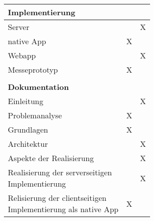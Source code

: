 \begin{table}[]
\begin{tabular}{|l|c|c|}
{\bf Implementierung}                                             &                                &                                     \\
\hline
Server                                                            &                                 & X                                   \\
\hline
native App                                                        & X                               &                                     \\
\hline
Webapp                                                            &                                 & X                                   \\
\hline
Messeprototyp                                                     & X                               &                                     \\
\hline
                                                                  &                                 &                                     \\
{\bf Dokumentation}                                               &                                 &                                     \\
\hline
Einleitung                                                        &                                 & X                                    \\
\hline
Problemanalyse                                                    & X                               &                                     \\
\hline
Grundlagen                                                        & X                               &                                     \\
\hline
Architektur                                                       &                                 & X                                   \\
\hline
Aspekte der Realisierung                                          &                                 & X                                   \\
\hline
\makecell[l]{Realisierung der serverseitigen\\Implementierung}    &                                 & X                                   \\
\hline
\makecell[l]{Relisierung der clientseitigen\\Implementierung als native App}     & X                               &                                     \\

\end{tabular}
\end{table}
